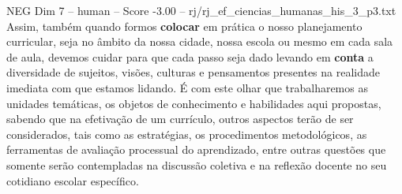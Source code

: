 \begin{textsample}{NEG Dim 7 – human – Score -3.00 – rj/rj\_ef\_ciencias\_humanas\_his\_3\_p3.txt}  \label{ex:f7_neg_001}
Assim, também quando formos \textbf{colocar} em prática o nosso planejamento curricular, seja no âmbito da nossa cidade, nossa escola ou mesmo em cada sala de aula, devemos cuidar para que cada passo seja dado levando em \textbf{conta} a diversidade de sujeitos, visões, culturas e pensamentos presentes na realidade imediata com que estamos lidando. É com este olhar que trabalharemos as unidades temáticas, os objetos de conhecimento e habilidades aqui propostas, sabendo que na efetivação de um currículo, outros aspectos terão de ser considerados, tais como as estratégias, os procedimentos metodológicos, as ferramentas de avaliação processual do aprendizado, entre outras questões que somente serão contempladas na discussão coletiva e na reflexão docente no seu cotidiano escolar específico.

\end{textsample}
